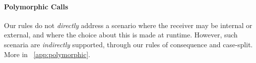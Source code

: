 %
%
%

\paragraph{%
Polymorphic Calls} Our rules do  not \emph{directly} address a scenario where  the receiver may be
   internal or external, and where  the choice about this is made at runtime. 
However, such scenaria  are \emph{indirectly} supported, through our rules of consequence and  case-split.
More   in  \A\  \ref{app:polymorphic}.

